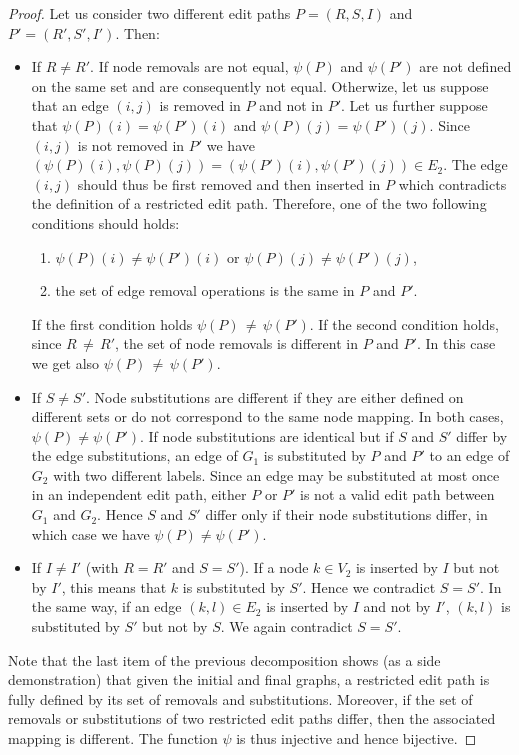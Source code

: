 \begin{proof}
  Let us consider two different edit paths $P=(R,S,I)$ and $P'=(R',S',I')$. Then:
  \begin{itemize}
  \item If $R\neq R'$. If node removals are not equal, $\psi(P)$ and
    $\psi(P')$ are not defined on the same set and are consequently
    not equal. Otherwize, let us suppose that an edge $(i,j)$ is
    removed in $P$ and not in $P'$. Let us further suppose that
    $\psi(P)(i)=\psi(P')(i)$ and $\psi(P)(j)=\psi(P')(j)$. Since
    $(i,j)$ is not removed in $P'$ we have
    $(\psi(P)(i),\psi(P)(j))=(\psi(P')(i),\psi(P')(j))\in E_2$. The
    edge $(i,j)$ should thus be first removed and then inserted in $P$
    which contradicts the definition of a restricted edit
    path. Therefore, one of the two following conditions should holds:
    \begin{enumerate}
    \item     $\psi(P)(i)\neq\psi(P')(i)$ or $\psi(P)(j)\neq\psi(P')(j)$,
    \item the set of edge removal operations is the same in $P$ and $P'$.
    \end{enumerate}
    If the first condition holds $\psi(P)\,{\neq}\,\psi(P')$. If the second
    condition holds, since $R\,{\neq}\,R'$, the set of node removals is
    different in $P$ and $P'$. In this case we get also
    $\psi(P)\,{\neq}\,\psi(P')$.
  \item If $S\neq S'$. Node substitutions are different if they are
    either defined on different sets or do not correspond to the same
    node mapping. In both cases, $\psi(P)\neq \psi(P')$. If node
    substitutions are identical but if $S$ and $S'$ differ by the
    edge substitutions, an edge of $G_1$ is substituted by $P$ and $P'$ to an edge of
    $G_2$ with two different labels. Since an edge may
    be substituted at most once in an independent edit path, either
    $P$ or $P'$ is not a valid edit path between $G_1$ and $G_2$.
    Hence $S$ and $S'$ differ only if their node substitutions differ, 
    in which case we have $\psi(P)\neq \psi(P')$.
  \item If $I\neq I'$ (with $R=R'$ and $S=S'$). If a node $k\in V_2$
    is inserted by $I$ but not by $I'$, this means that $k$ is
    substituted by $S'$. Hence we contradict $S=S'$. In the same way,
    if an edge $(k,l)\in E_2$ is inserted by $I$ and not by $I'$,
    $(k,l)$ is substituted by $S'$ but not by $S$. We again contradict
    $S=S'$.   
  \end{itemize}
  Note that the last item of the previous decomposition shows (as a
  side demonstration) that given the initial and final graphs, a
  restricted edit path is fully defined by its set of removals and
  substitutions.  Moreover, if the set of removals or substitutions of
  two restricted edit paths differ, then the associated mapping is
  different. The function $\psi$ is thus injective and hence
  bijective.
\end{proof}
